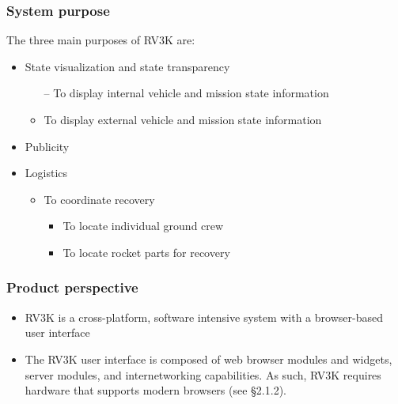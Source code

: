 \subsubsection{System purpose}
  The three main purposes of RV3K are:
  \begin{itemize}
    \item State visualization and state transparency
      \begin{itemize}
        \item[--] To display internal vehicle and mission state information
        \item To display external vehicle and mission state information
      \end{itemize}
    \item Publicity
    \item Logistics
      \begin{itemize}
        \item To coordinate recovery
          \begin{itemize}
            \item To locate individual ground crew
            \item To locate rocket parts for recovery
          \end{itemize}
      \end{itemize}
  \end{itemize}


\subsubsection{Product perspective}
  \begin{itemize}
      \item RV3K is a cross-platform, software intensive system with a browser-based user interface
      \item The RV3K user interface is composed of web browser modules and
        widgets, server modules, and internetworking capabilities.
        As such, RV3K requires hardware that supports modern
        browsers (see \S 2.1.2).
  \end{itemize}

